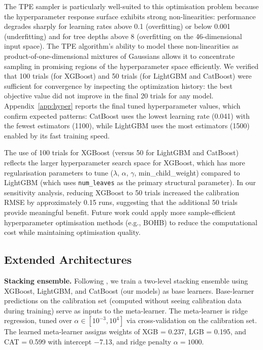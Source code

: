 \documentclass[10pt,a4paper,twocolumn]{article}
\begin{document}
The TPE sampler is particularly well-suited to this optimisation problem because the hyperparameter response surface exhibits strong non-linearities: performance degrades sharply for learning rates above 0.1 (overfitting) or below 0.001 (underfitting) and for tree depths above 8 (overfitting on the 46-dimensional input space). The TPE algorithm's ability to model these non-linearities as product-of-one-dimensional mixtures of Gaussians allows it to concentrate sampling in promising regions of the hyperparameter space efficiently. We verified that 100 trials (for XGBoost) and 50 trials (for LightGBM and CatBoost) were sufficient for convergence by inspecting the optimization history: the best objective value did not improve in the final 20 trials for any model. Appendix~\ref{app:hyper} reports the final tuned hyperparameter values, which confirm expected patterns: CatBoost uses the lowest learning rate (0.041) with the fewest estimators (1100), while LightGBM uses the most estimators (1500) enabled by its fast training speed.

The use of 100 trials for XGBoost (versus 50 for LightGBM and CatBoost) reflects the larger hyperparameter search space for XGBoost, which has more regularisation parameters to tune ($\lambda$, $\alpha$, $\gamma$, min\_child\_weight) compared to LightGBM (which uses \texttt{num\_leaves} as the primary structural parameter). In our sensitivity analysis, reducing XGBoost to 50 trials increased the calibration RMSE by approximately 0.15 runs, suggesting that the additional 50 trials provide meaningful benefit. Future work could apply more sample-efficient hyperparameter optimisation methods (e.g., BOHB) to reduce the computational cost while maintaining optimisation quality.

\subsection{Extended Architectures}

\textbf{Stacking ensemble.} Following \citet{Wolpert1992}, we train a two-level stacking ensemble using XGBoost, LightGBM, and CatBoost (our models) as base learners. Base-learner predictions on the calibration set (computed without seeing calibration data during training) serve as inputs to the meta-learner. The meta-learner is ridge regression, tuned over $\alpha \in [10^{-3}, 10^4]$ via cross-validation on the calibration set. The learned meta-learner assigns weights of XGB = 0.237, LGB = 0.195, and CAT = 0.599 with intercept $-$7.13, and ridge penalty $\alpha = 1000$.
\end{document}
